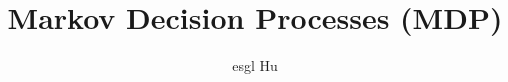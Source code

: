 \documentclass[12pt,a4paper]{article}
\begin{document}
\title{Markov Decision Processes (MDP)}
\author{esgl Hu}
\maketitle


\end{document}
